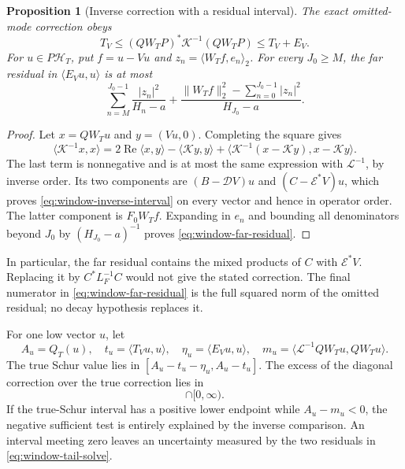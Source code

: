 \documentclass[11pt]{article}
\newtheorem{proposition}[theorem]{Proposition}
\theoremstyle{definition}
\theoremstyle{remark}
\numberwithin{equation}{section}
\begin{document}
\begin{proposition}[Inverse correction with a residual interval]
\label{prop:window-inverse-residual}
The exact omitted-mode correction obeys
\begin{equation}
 T_V\le (QW_TP)^*\mathcal K^{-1}(QW_TP)\le T_V+E_V.
 \label{eq:window-inverse-interval}
\end{equation}
For $u\in P\mathcal H_T$, put $f=u-Vu$ and
$z_n=\langle W_Tf,e_n\rangle_2$.  For every $J_0\ge M$, the
far residual in $\langle E_Vu,u\rangle$ is at most
\begin{equation}
 \sum_{n=M}^{J_0-1}\frac{|z_n|^2}{H_n-a}
  +\frac{\|W_Tf\|_2^2-\sum_{n=0}^{J_0-1}|z_n|^2}{H_{J_0}-a}.
 \label{eq:window-far-residual}
\end{equation}
\end{proposition}
\begin{proof}
Let $x=QW_Tu$ and $y=(Vu,0)$.  Completing the square gives
\[
 \langle\mathcal K^{-1}x,x\rangle
  =2\operatorname{Re}\langle x,y\rangle
       -\langle\mathcal Ky,y\rangle
       +\langle\mathcal K^{-1}(x-\mathcal Ky),x-\mathcal Ky\rangle.
\]
The last term is nonnegative and is at most the same expression
with $\mathcal L^{-1}$, by inverse order.  Its two components are
$(B-\mathcal D V)u$ and $(C-\mathcal E^*V)u$, which proves
\eqref{eq:window-inverse-interval} on every vector and hence in
operator order.  The latter component is $F_0W_Tf$.  Expanding in
$e_n$ and bounding all denominators beyond $J_0$ by
$(H_{J_0}-a)^{-1}$ proves \eqref{eq:window-far-residual}.
\end{proof}

In particular, the far residual contains the mixed products of
$C$ with $\mathcal E^*V$.  Replacing it by $C^*L_F^{-1}C$
would not give the stated correction.  The final numerator in
\eqref{eq:window-far-residual} is the full squared norm of the
omitted residual; no decay hypothesis replaces it.

For one low vector $u$, let
\[
 A_u=Q_T(u),\quad t_u=\langle T_Vu,u\rangle,\quad
 \eta_u=\langle E_Vu,u\rangle,\quad
 m_u=\langle\mathcal L^{-1}QW_Tu,QW_Tu\rangle.
\]
The true Schur value lies in
$[A_u-t_u-\eta_u,A_u-t_u]$.  The excess of the diagonal
correction over the true correction lies in
\begin{equation}
 [m_u-t_u-\eta_u,m_u-t_u]\cap[0,\infty).
 \label{eq:window-inverse-excess}
\end{equation}
If the true-Schur interval has a positive lower endpoint while
$A_u-m_u<0$, the negative sufficient test is entirely explained
by the inverse comparison.  An interval meeting zero leaves an
uncertainty measured by the two residuals in
\eqref{eq:window-tail-solve}.
\end{document}
